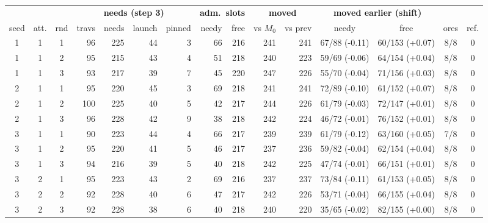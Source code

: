 \begin{tabular}{@{}ccc rrrr rr rr cc cc@{}}
\toprule
& & & \multicolumn{4}{c}{\textbf{needs (step 3)}} & \multicolumn{2}{c}{\textbf{adm.\ slots}} & \multicolumn{2}{c}{\textbf{moved}} & \multicolumn{2}{c}{\textbf{moved earlier (shift)}} & & \\
\cmidrule(lr){4-7}\cmidrule(lr){8-9}\cmidrule(lr){10-11}\cmidrule(lr){12-13}
seed & att. & rnd & travs & needs & launch & pinned & needy & free & vs $M_0$ & vs prev & needy & free & ores & ref.\\
\midrule
1 & 1 & 1 & 96 & 225 & 44 & 3 & 66 & 216 & 241 & 241 & 67/88 (-0.11) & 60/153 (+0.07) & 8/8 & 0\\
1 & 1 & 2 & 95 & 215 & 43 & 4 & 51 & 218 & 240 & 223 & 59/69 (-0.06) & 64/154 (+0.04) & 8/8 & 0\\
1 & 1 & 3 & 93 & 217 & 39 & 7 & 45 & 220 & 247 & 226 & 55/70 (-0.04) & 71/156 (+0.03) & 8/8 & 0\\
2 & 1 & 1 & 95 & 220 & 45 & 3 & 69 & 218 & 241 & 241 & 72/89 (-0.10) & 61/152 (+0.07) & 8/8 & 0\\
2 & 1 & 2 & 100 & 225 & 40 & 5 & 42 & 217 & 244 & 226 & 61/79 (-0.03) & 72/147 (+0.01) & 8/8 & 0\\
2 & 1 & 3 & 96 & 228 & 42 & 9 & 38 & 218 & 242 & 224 & 46/72 (-0.01) & 76/152 (+0.01) & 8/8 & 0\\
3 & 1 & 1 & 90 & 223 & 44 & 4 & 66 & 217 & 239 & 239 & 61/79 (-0.12) & 63/160 (+0.05) & 7/8 & 0\\
3 & 1 & 2 & 95 & 220 & 41 & 5 & 46 & 217 & 237 & 236 & 59/82 (-0.04) & 62/154 (+0.04) & 8/8 & 0\\
3 & 1 & 3 & 94 & 216 & 39 & 5 & 40 & 218 & 242 & 225 & 47/74 (-0.01) & 66/151 (+0.01) & 8/8 & 0\\
3 & 2 & 1 & 95 & 223 & 43 & 2 & 69 & 216 & 237 & 237 & 73/84 (-0.11) & 61/153 (+0.05) & 8/8 & 0\\
3 & 2 & 2 & 92 & 228 & 40 & 6 & 47 & 217 & 242 & 226 & 53/71 (-0.04) & 66/155 (+0.04) & 8/8 & 0\\
3 & 2 & 3 & 92 & 228 & 38 & 6 & 40 & 218 & 240 & 220 & 35/65 (-0.02) & 82/155 (+0.00) & 8/8 & 0\\

\bottomrule
\end{tabular}